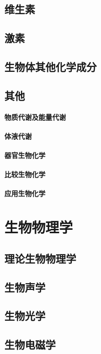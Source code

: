 \documentclass[UTF8]{../NatureUniverse}
\begin{document}
\section{维生素}
\section{激素}
\section{生物体其他化学成分}
\section{其他}
    \subsubsection{物质代谢及能量代谢}
    \subsubsection{体液代谢}
    \subsubsection{器官生物化学}
    \subsubsection{比较生物化学}
    \subsubsection{应用生物化学}








\chapter{生物物理学}
\section{理论生物物理学}
\section{生物声学}
\section{生物光学}
\section{生物电磁学}
\end{document}
